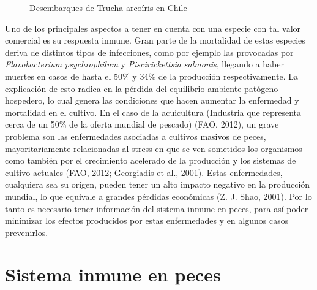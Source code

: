 \documentclass[12pt,a4paper,oneside]{scrbook}
\begin{document}
\begin{figure}[h]
\caption{Desembarques de Trucha arcoíris en Chile} \label{desembarques}
\end{figure}

Uno de los principales aspectos a tener en cuenta con una especie con
tal valor comercial es su respuesta inmune. Gran parte de la mortalidad
de estas especies deriva de distintos tipos de infecciones, como por
ejemplo las provocadas por \emph{Flavobacterium psychrophilum} y
\emph{Piscirickettsia salmonis}, llegando a haber muertes en casos de
hasta el 50\% y 34\% de la producción respectivamente. La explicación de
esto radica en la pérdida del equilibrio ambiente-patógeno-hospedero, lo
cual genera las condiciones que hacen aumentar la enfermedad y
mortalidad en el cultivo. En el caso de la acuicultura (Industria que
representa cerca de un 50\% de la oferta mundial de pescado) (FAO,
2012), un grave problema son las enfermedades asociadas a cultivos
masivos de peces, mayoritariamente relacionadas al stress en que se ven
sometidos los organismos como también por el crecimiento acelerado de la
producción y los sistemas de cultivo actuales (FAO, 2012; Georgiadis et
al., 2001)⁠⁠. Estas enfermedades, cualquiera sea su origen, pueden tener
un alto impacto negativo en la producción mundial, lo que equivale a
grandes pérdidas económicas (Z. J. Shao, 2001)⁠. Por lo tanto es
necesario tener información del sistema inmune en peces, para así poder
minimizar los efectos producidos por estas enfermedades y en algunos
casos prevenirlos.

\section{Sistema inmune en peces}
\end{document}
